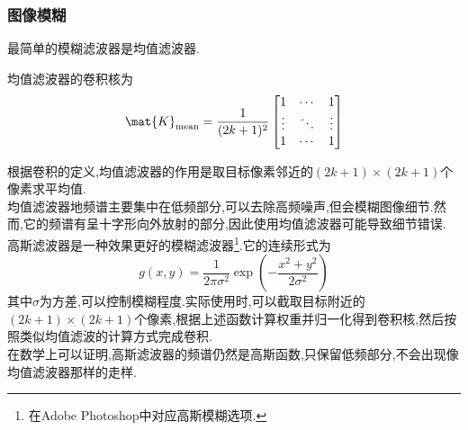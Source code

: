 \documentclass{ctexart}
\begin{document}
\subsubsection{图像模糊}
最简单的模糊滤波器是均值滤波器.
\begin{definition}[均值滤波器]
    均值滤波器的卷积核为
    \[\mat{K}_{\text{mean}}=\dfrac{1}{(2k+1)^2}\begin{bmatrix}
        1&\cdots&1\\
        \vdots&\ddots&\vdots\\
        1&\cdots&1
    \end{bmatrix}\]
\end{definition}
根据卷积的定义,均值滤波器的作用是取目标像素邻近的$(2k+1)\times(2k+1)$个像素求平均值.\\
\indent 均值滤波器地频谱主要集中在低频部分,可以去除高频噪声,但会模糊图像细节.然而,它的频谱有呈十字形向外放射的部分,因此使用均值滤波器可能导致细节错误.\\
\indent 高斯滤波器是一种效果更好的模糊滤波器\footnote{在Adobe Photoshop中对应高斯模糊选项.}.它的连续形式为
\[g(x,y)=\dfrac{1}{2\pi\sigma^2}\exp\left(-\dfrac{x^2+y^2}{2\sigma^2}\right)\]
其中$\sigma$为方差,可以控制模糊程度.实际使用时,可以截取目标附近的$(2k+1)\times(2k+1)$个像素,根据上述函数计算权重并归一化得到卷积核,然后按照类似均值滤波的计算方式完成卷积.\\
\indent 在数学上可以证明,高斯滤波器的频谱仍然是高斯函数,只保留低频部分,不会出现像均值滤波器那样的走样.
\end{document}
